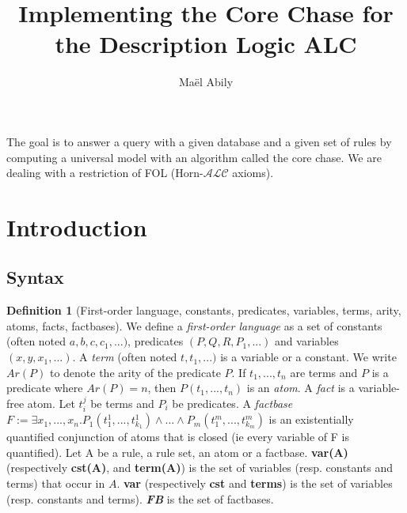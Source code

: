\documentclass{article}
\title{Implementing the Core Chase for the Description Logic ALC}
\author{Maël Abily}	%
\theoremstyle{definition}
\newtheorem{definition}{Definition}[section]
\theoremstyle{remark}
\begin{document}
\maketitle						%



\begin{comment}
I modified: definition of atom, the first remark, definition 2 and 3 (including the definition of core),exemple of core, proof of proposition 1.2, the def of $Tr_{T}(F)$, the last exemple and the def of universal model.
\end{comment}

The goal is to answer a query with a given database and a given set of rules by computing a universal model with an algorithm called the core chase. We are dealing with a restriction of FOL (Horn-$\mathcal{ALC}$ axioms).

\tableofcontents					%
\section{Introduction}

\subsection{Syntax}

\begin{definition}[First-order language, constants, predicates, variables, terms, arity, atoms, facts, factbases] We define a \emph{first-order language} as a set of constants (often noted $a,b,c,c_{1},...)$, predicates $(P,Q,R,P_{1},...)$ and variables $(x,y,x_{1},...)$. A \emph{term}  (often noted $t,t_{1},...)$ is a variable or a constant. We write \emph{$\textit{Ar}(P)$} to denote the arity of the predicate $P$. 
 If $t_1,...,t_n$ are terms and $P$ is a predicate where $Ar(P) = n$, then $P(t_{1},...,t_{n})$ is an \emph{atom}. A \emph{fact} is a variable-free atom. Let $t_i^j$ be terms and $P_i$ be predicates. A \emph{factbase} $F := \exists x_{1},...,x_{n}.P_{1}(t_{1}^{1},...,t_{k_{1}}^{1})\land ...\land P_{m}(t_{1}^{m},...,t_{k_{m}}^{m})$ is an existentially quantified conjunction of atoms that is closed (ie every variable of F is quantified). Let A be a rule, a rule set, an atom or a factbase. \textbf{var(A)} (respectively \textbf{cst(A)}, and \textbf{term(A)}) is the set of variables (resp. constants and terms) that occur in $A$. \textbf{var} (respectively \textbf{cst} and \textbf{terms}) is the set of variables (resp. constants and terms). \emph{\textbf{FB}} is the set of factbases.
\end{definition}
\end{document}
